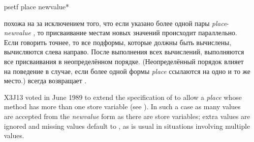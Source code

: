 \begin{defmac}
psetf {place newvalue}*

 похожа на  за исключением того, что если указано более одной 
пары
\emph{place}-\emph{newvalue} , то присваивание местам новых значений 
происходит параллельно. Если говорить точнее, то все подформы, которые должны 
быть вычислены, вычисляются слева направо. После выполнения всех вычислений,
выполняются все присваивания в неопределённом порядке.
(Неопределённый порядок влияет на поведение в случае, если более одной формы
\emph{place} ссылаются на одно и то же место.)
 всегда возвращает {\false}.

\begin{newer}
X3J13 voted in June 1989 
to extend the specification of  to allow a \emph{place}
whose  method has more than one store variable (see ).
In such a case as many values are accepted from the \emph{newvalue} form
as there are store variables; extra values are ignored
and missing values default to ,
as is usual in situations involving multiple values.
\end{newer}
\end{defmac}

